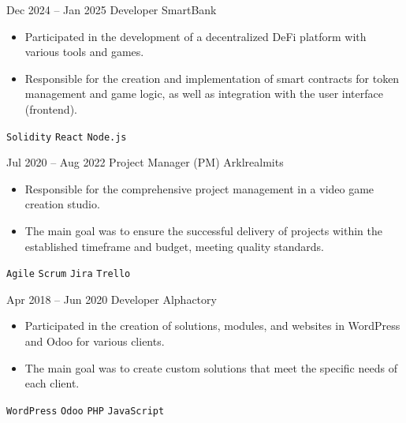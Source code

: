\documentclass[9pt]{developercv}
\begin{document}
\vspace{-10 pt}
\begin{entrylist}
   
\end{entrylist}

\vspace{-10 pt}
\begin{entrylist}
	\entry
        {Dec 2024 – Jan 2025}
		{Developer}
		{SmartBank}
		{\vspace{-10pt}
        \begin{itemize}[noitemsep,topsep=0pt,parsep=0pt,partopsep=0pt, leftmargin=-1pt]
            \item Participated in the development of a decentralized DeFi platform with various tools and games.
            \item Responsible for the creation and implementation of smart contracts for token management and game logic, as well as integration with the user interface (frontend).
        \end{itemize} 
        \texttt{Solidity} \slashsep \texttt{React} \slashsep \texttt{Node.js}}
	\entry
		{Jul 2020 – Aug 2022}
		{Project Manager (PM)}
		{Arklrealmits}
		{\vspace{-10pt}
        \begin{itemize}[noitemsep,topsep=0pt,parsep=0pt,partopsep=0pt, leftmargin=-1pt]
            \item Responsible for the comprehensive project management in a video game creation studio.
            \item  The main goal was to ensure the successful delivery of projects within the established timeframe and budget, meeting quality standards.
        \end{itemize} 
        \texttt{Agile} \slashsep \texttt{Scrum} \slashsep \texttt{Jira} \slashsep \texttt{Trello}}
	\entry
		{Apr 2018 – Jun 2020}
		{Developer}
		{Alphactory}
		{\vspace{-10pt}
        \begin{itemize}[noitemsep,topsep=0pt,parsep=0pt,partopsep=0pt, leftmargin=-1pt]
            \item Participated in the creation of solutions, modules, and websites in WordPress and Odoo for various clients.
            \item The main goal was to create custom solutions that meet the specific needs of each client.
        \end{itemize} 
        \texttt{WordPress} \slashsep \texttt{Odoo} \slashsep \texttt{PHP} \slashsep \texttt{JavaScript}}

\end{entrylist}
\end{document}

